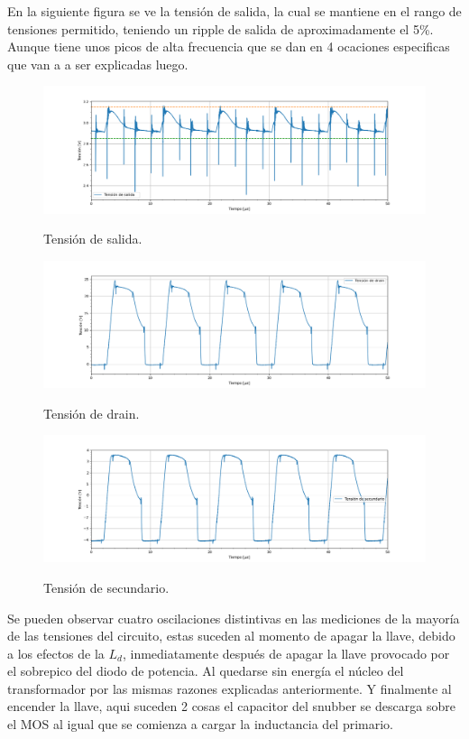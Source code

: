 En la siguiente figura se ve  la tensión de salida, la cual se mantiene en el rango de tensiones permitido, teniendo un ripple de salida de aproximadamente el 5\%.  Aunque tiene unos picos de alta frecuencia que se dan en 4 ocaciones especificas que van a a ser explicadas luego.

\begin{figure}[H]
	\centering	\includegraphics[width=0.9\linewidth]{ImagenesParteIV/Vout.png}
	\label{fig:vout_4}
	\caption{Tensión de salida.}
\end{figure}
\begin{figure}[H]
	\centering
	\includegraphics[width=0.9\linewidth]{ImagenesParteIV/Vds.png}
	\label{fig:vds_4}
	\caption{Tensión de drain.}
\end{figure}
\begin{figure}[H]
	\centering
	\includegraphics[width=0.9\linewidth]{ImagenesParteIV/Vsec.png}
	\label{fig:vsec_4}
	\caption{Tensión de secundario.}
\end{figure}
Se pueden observar cuatro oscilaciones distintivas en las mediciones de la mayoría de las tensiones del circuito, estas suceden al momento de apagar la llave, debido a los efectos de la $L_d$, inmediatamente después de apagar la llave provocado por el sobrepico del diodo de potencia. Al quedarse sin energía el núcleo del transformador por las mismas razones explicadas anteriormente. Y finalmente al encender la llave, aqui suceden 2 cosas el capacitor del snubber se descarga sobre el MOS al igual que se comienza a cargar la inductancia del primario.
%